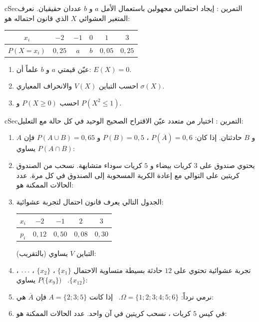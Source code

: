 \documentclass[12pt,a4paper]{article}
\newenvironment{BOX}[2]{\begin{otherlanguage}{english}\begin{arbox}{#1}{#2}}{\end{arbox}\end{otherlanguage}}
\newcounter{exo}
\newenvironment{tamrin}[1]{\stepcounter{exo}\begin{BOX}{cSec}{التمرين \theexo: #1}}{\end{BOX}}
\renewcommand{\ldots}{\mathinner{\ldotp\ldotp\ldotp}}
\begin{document}
\begin{tamrin}{إيجاد احتمالين مجهولين باستعمال الأمل}
$a$ و $b$ عددان حقيقيان. نعرف المتغير العشوائي $X$ الذي قانون احتماله هو:
\begin{center}
\renewcommand{\arraystretch}{1.4}
\begin{tabular}{|C|c|c|c|c|c|}\hline
{}$x_i$ & $-2$ & $-1$ & $0$ & $1$ & $3$\\
\hline
$P(X=x_i)$ & $0{,}25$ & $a$ & $b$ & $0{,}05$ & $0{,}25$\\
\hline
\end{tabular}
\end{center}
\begin{enumerate}
\item عيّن قيمتي $a$ و $b$ علماً أن: $E(X)=0$.
\item احسب التباين $V(X)$ والانحراف المعياري $\sigma(X)$.
\item احسب $P(X\ge0)$ و $P(X^2\le1)$.
\end{enumerate}
\end{tamrin}

\begin{tamrin}{اختيار من متعدد}
عيّن الاقتراح الصحيح الوحيد في كل حالة مع التعليل:
\begin{enumerate}
\item $A$ و $B$ حادثتان. إذا كان: $P(\overline A)=0{,}6$ ، $P(B)=0{,}5$ و $P(A\cup B)=0{,}65$ فإن $P(A\cap B)$ يساوي:
\item يحتوي صندوق على $3$ كريات بيضاء و $5$ كريات سوداء متشابهة. نسحب من الصندوق كريتين على التوالي مع إعادة الكرية المسحوبة إلى الصندوق في كل مرة. عدد الحالات الممكنة هو:
\item الجدول التالي يعرف قانون احتمال لتجربة عشوائية:
\begin{center}
\renewcommand{\arraystretch}{1.3}
\begin{tabular}{|C|c|c|c|c|}\hline
{}$x_i$ & $-2$ & $-1$ & $2$ & $3$\\
\hline
$p_i$ & $0{,}12$ & $0{,}50$ & $0{,}08$ & $0{,}30$\\
\hline
\end{tabular}
\end{center}
التباين $V$ يساوي (بالتقريب):
\item تجربة عشوائية تحتوي على $12$ حادثة بسيطة متساوية الاحتمال $\{x_1\}$ ، $\{x_2\}$ ، $\ldots$ ، $\{x_{12}\}$. \ $P\big(\{x_9\}\big)$ يساوي:
\item نرمي نرداً: $\Omega=\{1;2;3;4;5;6\}$. \ إذا كانت $A=\{2;3;5\}$ فإن $\overline A$ هي:
\item في كيس $5$ كريات ، نسحب كريتين في آن واحد. عدد الحالات الممكنة هو:
\end{enumerate}
\end{tamrin}
\end{document}
